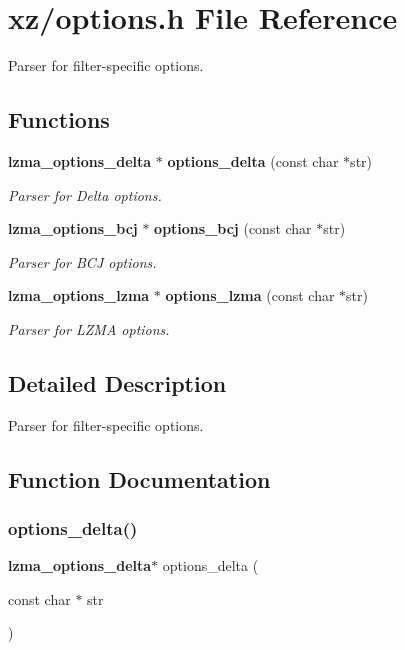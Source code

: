 \section{xz/options.h File Reference}
\label{options_8h}


Parser for filter-\/specific options.  


\subsection*{Functions}
\begin{DoxyCompactItemize}
\item 
\textbf{ lzma\+\_\+options\+\_\+delta} $\ast$ \textbf{ options\+\_\+delta} (const char $\ast$str)
\begin{DoxyCompactList}\small\item\em Parser for Delta options. \end{DoxyCompactList}\item 
\textbf{ lzma\+\_\+options\+\_\+bcj} $\ast$ \textbf{ options\+\_\+bcj} (const char $\ast$str)
\begin{DoxyCompactList}\small\item\em Parser for B\+CJ options. \end{DoxyCompactList}\item 
\textbf{ lzma\+\_\+options\+\_\+lzma} $\ast$ \textbf{ options\+\_\+lzma} (const char $\ast$str)
\begin{DoxyCompactList}\small\item\em Parser for L\+Z\+MA options. \end{DoxyCompactList}\end{DoxyCompactItemize}


\subsection{Detailed Description}
Parser for filter-\/specific options. 



\subsection{Function Documentation}
\mbox{\label{options_8h_aeb75b1d0565a4c9372b2ff3d7cbd6898}} 
\subsubsection{options\+\_\+delta()}
{\footnotesize\ttfamily \textbf{ lzma\+\_\+options\+\_\+delta}$\ast$ options\+\_\+delta (\begin{DoxyParamCaption}\item[{const char $\ast$}]{str }\end{DoxyParamCaption})}



